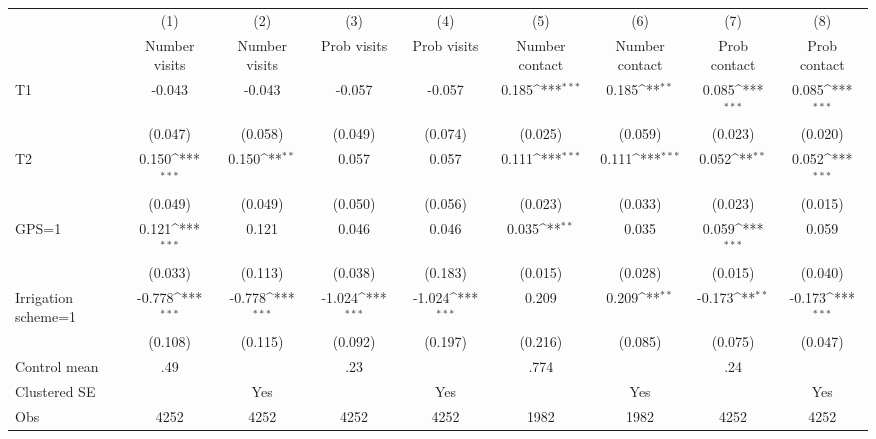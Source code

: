 {
\def\sym#1{\ifmmode^{#1}\else\(^{#1}\)\fi}
\begin{tabular}{l*{8}{c}}
\hline\hline
                    &\multicolumn{1}{c}{(1)}         &\multicolumn{1}{c}{(2)}         &\multicolumn{1}{c}{(3)}         &\multicolumn{1}{c}{(4)}         &\multicolumn{1}{c}{(5)}         &\multicolumn{1}{c}{(6)}         &\multicolumn{1}{c}{(7)}         &\multicolumn{1}{c}{(8)}         \\
                    &Number visits         &Number visits         &Prob visits         &Prob visits         &Number contact         &Number contact         &Prob contact         &Prob contact         \\
\hline
T1                  &-0.043         &-0.043         &-0.057         &-0.057         &0.185\sym{***}&0.185\sym{**} &0.085\sym{***}&0.085\sym{***}\\
                    &(0.047)         &(0.058)         &(0.049)         &(0.074)         &(0.025)         &(0.059)         &(0.023)         &(0.020)         \\
T2                  &0.150\sym{***}&0.150\sym{**} &0.057         &0.057         &0.111\sym{***}&0.111\sym{***}&0.052\sym{**} &0.052\sym{***}\\
                    &(0.049)         &(0.049)         &(0.050)         &(0.056)         &(0.023)         &(0.033)         &(0.023)         &(0.015)         \\
GPS=1               &0.121\sym{***}&0.121         &0.046         &0.046         &0.035\sym{**} &0.035         &0.059\sym{***}&0.059         \\
                    &(0.033)         &(0.113)         &(0.038)         &(0.183)         &(0.015)         &(0.028)         &(0.015)         &(0.040)         \\
Irrigation scheme=1 &-0.778\sym{***}&-0.778\sym{***}&-1.024\sym{***}&-1.024\sym{***}&0.209         &0.209\sym{**} &-0.173\sym{**} &-0.173\sym{***}\\
                    &(0.108)         &(0.115)         &(0.092)         &(0.197)         &(0.216)         &(0.085)         &(0.075)         &(0.047)         \\
\hline
Control mean        &  .49         &              &  .23         &              & .774         &              &  .24         &              \\
Clustered SE        &              &  Yes         &              &  Yes         &              &  Yes         &              &  Yes         \\
Obs                 & 4252         & 4252         & 4252         & 4252         & 1982         & 1982         & 4252         & 4252         \\
\hline\hline
\end{tabular}
}
